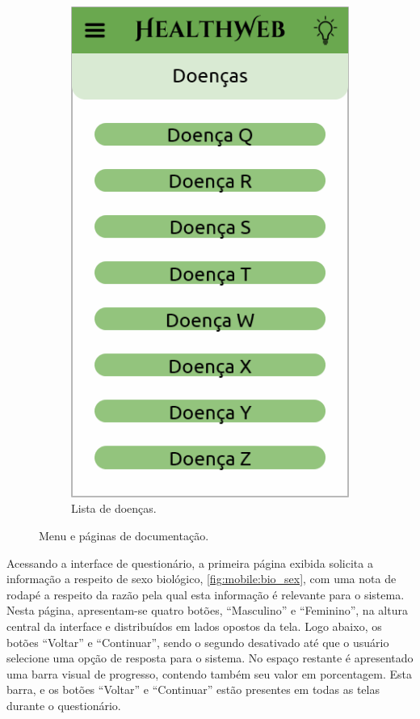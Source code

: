 \begin{figure}[htbp]
\begin{subfigure}{0.24\linewidth}
		\includegraphics[width=\linewidth]{figure/prototype/mobile/list_disease.png}
		\caption{Lista de doenças.}
		\label{fig:mobile:list_disease}
	\end{subfigure}
	\caption{Menu e páginas de documentação.}
	\label{fig:mobile:drawer_about_terms_list_disease}
\end{figure}

Acessando a interface de questionário, a primeira página exibida solicita a informação a respeito de sexo biológico, \ref{fig:mobile:bio_sex}, com uma nota de rodapé a respeito da razão pela qual esta informação é relevante para o sistema.
Nesta página, apresentam-se quatro botões, ``Masculino'' e ``Feminino'', na altura central da interface e distribuídos em lados opostos da tela.
Logo abaixo, os botões ``Voltar'' e ``Continuar'', sendo o segundo desativado até que o usuário selecione uma opção de resposta para o sistema.
No espaço restante é apresentado uma barra visual de progresso, contendo também seu valor em porcentagem. Esta barra, e os botões ``Voltar'' e ``Continuar'' estão presentes em todas as telas durante o questionário.

